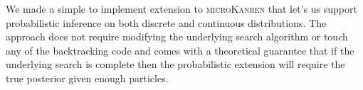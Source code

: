 \documentclass[
]{ceurart}
\begin{document}
We made a simple to implement extension to \textsc{microKanren} that
let's us support probabilistic inference on both discrete and
continuous distributions. The approach does not require modifying the
underlying search algorithm or touch any of the backtracking code and
comes with a theoretical guarantee that if the underlying search is
complete then the probabilistic extension will require the true
posterior given enough particles.



\end{document}
